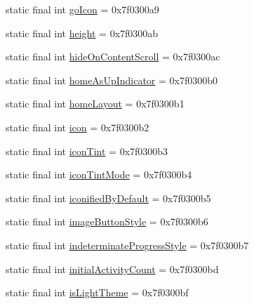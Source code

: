 \begin{DoxyCompactItemize}
\item 
static final int \mbox{\hyperlink{classandroid_1_1support_1_1v7_1_1appcompat_1_1_r_1_1attr_a817028431fb50ad70b0761d4813ee1dd}{go\+Icon}} = 0x7f0300a9
\item 
static final int \mbox{\hyperlink{classandroid_1_1support_1_1v7_1_1appcompat_1_1_r_1_1attr_ae2766034f35dee610b4cf8dbff1ce762}{height}} = 0x7f0300ab
\item 
static final int \mbox{\hyperlink{classandroid_1_1support_1_1v7_1_1appcompat_1_1_r_1_1attr_af0d56ba3b5798b633d10f4b184f4d98f}{hide\+On\+Content\+Scroll}} = 0x7f0300ac
\item 
static final int \mbox{\hyperlink{classandroid_1_1support_1_1v7_1_1appcompat_1_1_r_1_1attr_a29f06cbfa3eb9526975250ade81dade5}{home\+As\+Up\+Indicator}} = 0x7f0300b0
\item 
static final int \mbox{\hyperlink{classandroid_1_1support_1_1v7_1_1appcompat_1_1_r_1_1attr_a0eb473a3dd928bba368900667c203cc1}{home\+Layout}} = 0x7f0300b1
\item 
static final int \mbox{\hyperlink{classandroid_1_1support_1_1v7_1_1appcompat_1_1_r_1_1attr_a760a18e31f16c4508d2b044b6ddf8f18}{icon}} = 0x7f0300b2
\item 
static final int \mbox{\hyperlink{classandroid_1_1support_1_1v7_1_1appcompat_1_1_r_1_1attr_a2a291819286ee3463790dc7b79501ac1}{icon\+Tint}} = 0x7f0300b3
\item 
static final int \mbox{\hyperlink{classandroid_1_1support_1_1v7_1_1appcompat_1_1_r_1_1attr_a3798696d59e9d820a50f17a9099e5df7}{icon\+Tint\+Mode}} = 0x7f0300b4
\item 
static final int \mbox{\hyperlink{classandroid_1_1support_1_1v7_1_1appcompat_1_1_r_1_1attr_aa4ac7a86dce6917cc2b82fb3ff0ec91c}{iconified\+By\+Default}} = 0x7f0300b5
\item 
static final int \mbox{\hyperlink{classandroid_1_1support_1_1v7_1_1appcompat_1_1_r_1_1attr_ae6cb67b0d2b193ad62982dd7ebfc8cd2}{image\+Button\+Style}} = 0x7f0300b6
\item 
static final int \mbox{\hyperlink{classandroid_1_1support_1_1v7_1_1appcompat_1_1_r_1_1attr_a7ccf7bdae61fca08bef72600f4fb70bb}{indeterminate\+Progress\+Style}} = 0x7f0300b7
\item 
static final int \mbox{\hyperlink{classandroid_1_1support_1_1v7_1_1appcompat_1_1_r_1_1attr_af7e4f93600e0713be671334dc7ec8676}{initial\+Activity\+Count}} = 0x7f0300bd
\item 
static final int \mbox{\hyperlink{classandroid_1_1support_1_1v7_1_1appcompat_1_1_r_1_1attr_a7977bfc92e0cda3d33e12833fd72db80}{is\+Light\+Theme}} = 0x7f0300bf

\end{DoxyCompactItemize}
